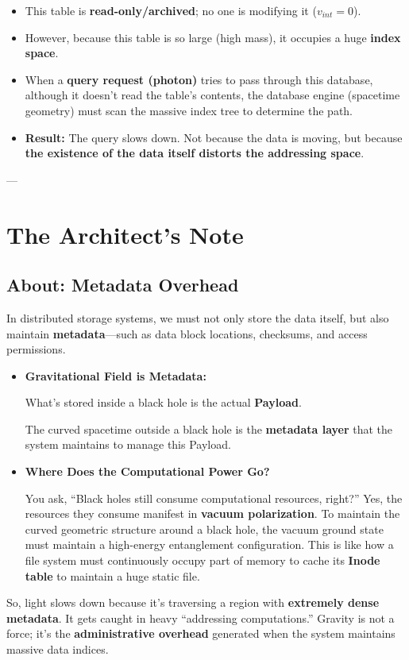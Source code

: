\begin{itemize}
\item This table is \textbf{read-only/archived}; no one is modifying it (\textbf{$v_{int}=0$}).

\item However, because this table is so large (high mass), it occupies a huge \textbf{index space}.

\item When a \textbf{query request (photon)} tries to pass through this database, although it doesn't read the table's contents, the database engine (spacetime geometry) must scan the massive index tree to determine the path.

\item \textbf{Result:} The query slows down. Not because the data is moving, but because \textbf{the existence of the data itself distorts the addressing space}.
\end{itemize}

---

\section{The Architect's Note}

\subsection{About: Metadata Overhead}

In distributed storage systems, we must not only store the data itself, but also maintain \textbf{metadata}---such as data block locations, checksums, and access permissions.

\begin{itemize}
\item \textbf{Gravitational Field is Metadata:}

    What's stored inside a black hole is the actual \textbf{Payload}.

    The curved spacetime outside a black hole is the \textbf{metadata layer} that the system maintains to manage this Payload.

\item \textbf{Where Does the Computational Power Go?}

    You ask, ``Black holes still consume computational resources, right?'' Yes, the resources they consume manifest in \textbf{vacuum polarization}. To maintain the curved geometric structure around a black hole, the vacuum ground state must maintain a high-energy entanglement configuration. This is like how a file system must continuously occupy part of memory to cache its \textbf{Inode table} to maintain a huge static file.
\end{itemize}

So, light slows down because it's traversing a region with \textbf{extremely dense metadata}. It gets caught in heavy ``addressing computations.'' Gravity is not a force; it's the \textbf{administrative overhead} generated when the system maintains massive data indices.

